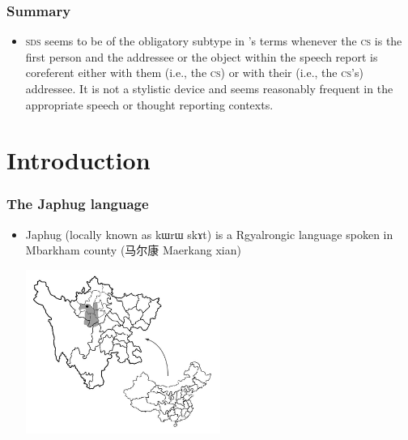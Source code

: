 \documentclass[xcolor=table]{beamer}
\newcommand{\ipa}[1]{{\phon #1}} %
\newcommand{\zh}[1]{{\cn #1}}
\begin{document}
\begin{frame}
 \frametitle{Summary}

\begin{itemize}
 \item \textsc{sds} seems to be of the obligatory subtype in \cite{aikhenvald08semidirect}'s terms whenever the \textsc{cs} is the first person and the addressee or the object within the speech report is coreferent either with them (i.e., the \textsc{cs}) or with their (i.e., the \textsc{cs}'s) addressee. It is not a stylistic device and seems reasonably frequent in the appropriate speech or thought reporting contexts.
\end{itemize}
\end{frame}


\begin{frame}
\begin{center}
\huge{} 
\end{center}
\end{frame}
 
\section{Introduction}
\begin{frame}
\frametitle{The Japhug language}


\begin{itemize}
 \item  Japhug (locally known as \ipa{kɯrɯ skɤt}) is a Rgyalrongic language spoken in Mbarkham county (\zh{马尔康} Maerkang xian) 

\includegraphics[width=0.5\textwidth]{carte.JPG}

\end{itemize}
\end{frame} 
\end{document}
